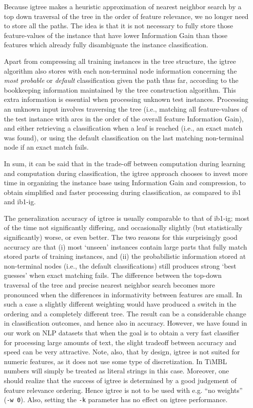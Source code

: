 \documentclass{report}
\begin{document}
Because {\sc igtree} makes a heuristic approximation of nearest
neighbor search by a top down traversal of the tree in the order of
feature relevance, we no longer need to store all the paths. The idea
is that it is not necessary to fully store those feature-values of the
instance that have lower Information Gain than those features which
already fully disambiguate the instance classification.

Apart from compressing all training instances in the tree structure,
the {\sc igtree} algorithm also stores with each non-terminal node
information concerning the {\em most probable} or {\em default}
classification given the path thus far, according to the bookkeeping
information maintained by the tree construction algorithm. This extra
information is essential when processing unknown test instances.
Processing an unknown input involves traversing the tree (i.e.,
matching all feature-values of the test instance with arcs in the
order of the overall feature Information Gain), and either retrieving
a classification when a leaf is reached (i.e., an exact match was
found), or using the default classification on the last matching
non-terminal node if an exact match fails.

In sum, it can be said that in the trade-off between computation
during learning and computation during classification, the {\sc
igtree} approach chooses to invest more time in organizing the
instance base using Information Gain and compression, to obtain
simplified and faster processing during classification,
as compared to {\sc ib1} and {\sc ib1-ig}.
 
The generalization accuracy of {\sc igtree} is usually comparable to
that of {\sc ib1-ig}; most of the time not significantly differing,
and occasionally slightly (but statistically significantly) worse, or
even better.  The two reasons for this surprisingly good accuracy are
that (i) most `unseen' instances contain large parts that
fully match stored parts of training instances, and (ii) the
probabilistic information stored at non-terminal nodes (i.e., the
default classifications) still produces strong `best guesses' when
exact matching fails. The difference between the top-down traversal of
the tree and precise nearest neighbor search becomes more pronounced
when the differences in informativity between features are small. In
such a case a slightly different weighting would have produced a
switch in the ordering and a completely different tree. The result can
be a considerable change in classification outcomes, and hence also in
accuracy. However, we have found in our work on NLP datasets that when
the goal is to obtain a very fast classifier for processing large
amounts of text, the slight tradeoff between accuracy and speed can be
very attractive. Note, also, that by design, {\sc igtree} is not
suited for numeric features, as it does not use some type of
discretization. In TiMBL numbers will simply be treated as literal
strings in this case. Moreover, one should realize that the success of
{\sc igtree} is determined by a good judgement of feature relevance
ordering. Hence {\sc igtree} is not to be used with e.g. ``no
weights'' ({\tt -w 0}). Also, setting the {\tt -k} parameter has no
effect on {\sc igtree} performance.
\end{document}
